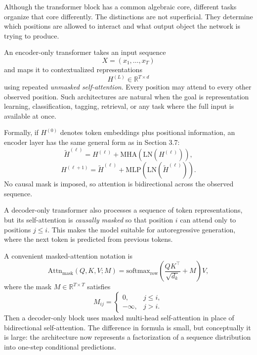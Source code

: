 Although the transformer block has a common algebraic core, different tasks organize that core differently.
The distinctions are not superficial.
They determine which positions are allowed to interact and what output object the network is trying to produce.

\begin{definition}
An encoder-only transformer takes an input sequence
\[
X = (x_1,\dots,x_T)
\]
and maps it to contextualized representations
\[
H^{(L)} \in \mathbb{R}^{T \times d}
\]
using repeated \emph{unmasked self-attention}.
Every position may attend to every other observed position.
Such architectures are natural when the goal is representation learning, classification, tagging, retrieval, or any task where the full input is available at once.
\end{definition}

Formally, if \(H^{(0)}\) denotes token embeddings plus positional information, an encoder layer has the same general form as in Section 3.7:
\[
\widetilde{H}^{(\ell)}
=
H^{(\ell)} + \mathrm{MHA}(\mathrm{LN}(H^{(\ell)})),
\]
\[
H^{(\ell+1)}
=
\widetilde{H}^{(\ell)} + \mathrm{MLP}(\mathrm{LN}(\widetilde{H}^{(\ell)})).
\]
No causal mask is imposed, so attention is bidirectional across the observed sequence.

\begin{definition}
A decoder-only transformer also processes a sequence of token representations, but its self-attention is \emph{causally masked} so that position \(i\) can attend only to positions \(j \le i\).
This makes the model suitable for autoregressive generation, where the next token is predicted from previous tokens.
\end{definition}

A convenient masked-attention notation is
\[
\mathrm{Attn}_{\mathrm{mask}}(Q,K,V;M)
=
\mathrm{softmax}_{\mathrm{row}}\!\left(\frac{QK^{\top}}{\sqrt{d_k}} + M\right)V,
\]
where the mask \(M \in \mathbb{R}^{T \times T}\) satisfies
\[
M_{ij}=
\begin{cases}
0, & j \le i,\\
-\infty, & j > i.
\end{cases}
\]
Then a decoder-only block uses masked multi-head self-attention in place of bidirectional self-attention.
The difference in formula is small, but conceptually it is large: the architecture now represents a factorization of a sequence distribution into one-step conditional predictions.

